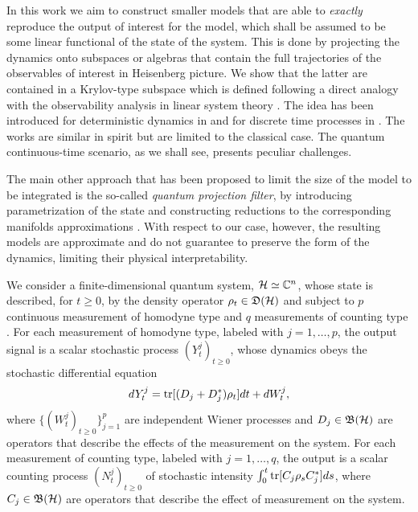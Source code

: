 \documentclass[aihp,12pt]{imsart}
\begin{document}
\vspace{3mm} In this work we aim to construct smaller models that are able to {\em exactly} reproduce the output of interest for the model, which shall be assumed to be some linear functional of the state of the system. This is done by projecting the dynamics onto subspaces or algebras that contain the full trajectories of the observables of interest in Heisenberg picture. We show that the latter are contained in a Krylov-type subspace \cite{kry31} which is defined following a direct analogy with the observability analysis in linear system theory \cite{kalman1969topics}. The idea has been introduced for deterministic dynamics in \cite{tit2023,prxq2024} and for discrete time processes in \cite{letter2024}. The works \cite{legoll2010effective,hartman2020} are similar in spirit but are limited to the classical case. The quantum continuous-time scenario, as we shall see, presents peculiar challenges.

The main other approach that has been proposed to limit the size of the model to be integrated is the so-called {\em quantum projection filter}, by introducing parametrization of the state and constructing reductions to the corresponding manifolds approximations \cite{ramadan_exact_2023, nurdin_structures_2014, gao_design_2020, gao_improved_2020, handel_quantum_2005, gao_exponential_2018}. With respect to our case, however, the resulting models are approximate and do not guarantee to preserve the form of the dynamics, limiting their physical interpretability.

\vspace{3mm}{\em System and measurements:} We consider a finite-dimensional quantum system, \(\mathcal{H}\simeq\mathbb{C}^n\), whose state is described, for $t\geq0$, by the density operator $\rho_t\in\mathfrak{D}(\mathcal{H})$ and subject to $p$ continuous measurement of homodyne type \cite{barchielli2009quantum} and $q$ measurements of counting type \cite{barchielli1991measurements11}.
For each measurement of homodyne type, labeled with $j=1,\dots,p$, the output signal is a scalar stochastic process $(Y_t^j)_{t\geq0}$, whose dynamics obeys the stochastic differential equation 
\begin{equation}\label{eq:output}
    dY_t^j = {\rm tr}[(D_j+D_j^*)\rho_t]dt + dW_{t}^j,
\end{equation}
where $\{(W_t^j)_{t\geq0}\}_{j=1}^p$ are independent Wiener processes and $D_j\in\mathfrak{B}(\mathcal{H})$ are operators that describe the effects of the measurement on the system. 
For each measurement of counting type, labeled with $j=1,\dots,q$, the output is a scalar counting process $(N_t^j)_{t\geq0}$ of stochastic intensity \(\int_{0}^t {\rm tr}[C_j\rho_{s} C_j^*]ds\), where $C_j\in\mathfrak{B}(\mathcal{H})$ are operators that describe the effect of measurement on the system. 
\bigskip
\end{document}
